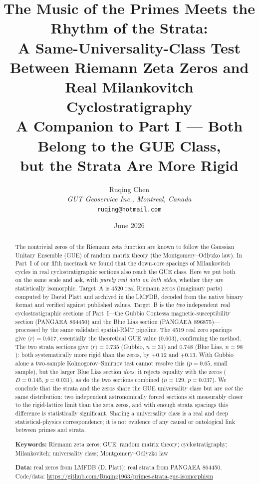\documentclass[12pt,a4paper]{article}
\title{\textbf{The Music of the Primes Meets the Rhythm of the Strata:\\
A Same-Universality-Class Test Between Riemann Zeta Zeros and\\
Real Milankovitch Cyclostratigraphy}\\[4pt]
\large A Companion to Part I --- Both Belong to the GUE Class,\\
but the Strata Are More Rigid}
\author{Ruqing Chen\\
\textit{GUT Geoservice Inc., Montreal, Canada}\\
\texttt{ruqing@hotmail.com}}
\date{June 2026}
\begin{document}
\maketitle

\begin{abstract}
The nontrivial zeros of the Riemann zeta function are known to follow the Gaussian Unitary Ensemble (GUE) of random matrix theory (the Montgomery--Odlyzko law). In Part~I of our fifth racetrack \citep{chen2026spatial} we found that the down-core spacings of Milankovitch cycles in real cyclostratigraphic sections also reach the GUE class. Here we put both on the same scale and ask, with \emph{purely real data on both sides}, whether they are statistically isomorphic. Target~A is 4520 real Riemann zeros (imaginary parts) computed by David Platt and archived in the LMFDB, decoded from the native binary format and verified against published values. Target~B is the \emph{two} independent real cyclostratigraphic sections of Part~I---the Gubbio Contessa magnetic-susceptibility section (PANGAEA 864450) and the Blue Lias section (PANGAEA 896875)---processed by the same validated spatial-RMT pipeline. The 4519 real zero spacings give $\langle r\rangle = 0.617$, essentially the theoretical GUE value (0.603), confirming the method. The two strata sections give $\langle r\rangle = 0.735$ (Gubbio, $n=31$) and $0.748$ (Blue Lias, $n=98$): both systematically more rigid than the zeros, by $+0.12$ and $+0.13$. With Gubbio alone a two-sample Kolmogorov--Smirnov test cannot resolve this ($p=0.65$, small sample), but the larger Blue Lias section \emph{does}: it rejects equality with the zeros ($D=0.145$, $p=0.031$), as do the two sections combined ($n=129$, $p=0.037$). We conclude that the strata and the zeros share the GUE universality class but are \emph{not} the same distribution: two independent astronomically forced sections sit measurably closer to the rigid-lattice limit than the zeta zeros, and with enough strata spacings this difference is statistically significant. Sharing a universality class is a real and deep statistical-physics correspondence; it is not evidence of any causal or ontological link between primes and strata.

\medskip
\noindent\textbf{Keywords:} Riemann zeta zeros; GUE; random matrix theory; cyclostratigraphy; Milankovitch; universality class; Montgomery--Odlyzko law

\medskip
\noindent\textbf{Data:} real zeros from LMFDB (D. Platt); real strata from PANGAEA 864450. Code/data: \url{https://github.com/Ruqing1963/primes-strata-gue-isomorphism}
\end{abstract}
\end{document}
